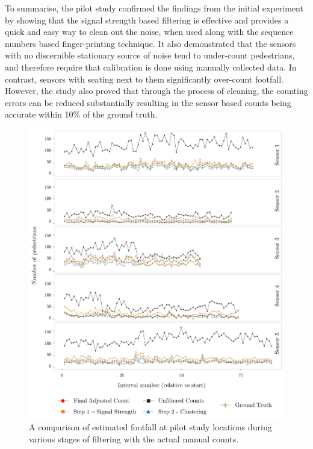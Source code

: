 To summarise, the pilot study confirmed the findings from the initial experiment by showing that the signal strength based filtering is effective and provides a quick and easy way to clean out the noise, when used along with the sequence numbers based finger-printing technique.
It also demonstrated that the sensors with no discernible  stationary  source  of  noise  tend to under-count pedestrians, and therefore require that calibration is done using manually collected data.
In contrast, sensors with seating next to them significantly over-count footfall.
However, the study also proved that through the process of cleaning, the counting errors can be reduced substantially resulting in the sensor based counts being accurate within 10\% of the ground truth.

\begin{figure}
  \includegraphics[trim=6 6 6 6, clip]{images/processing-pilot-results.jpg}
  \caption{A comparison of estimated footfall at pilot study locations during various stages of filtering with the actual manual counts.}
  \label{figure:processing:pilot:final}
\end{figure}

